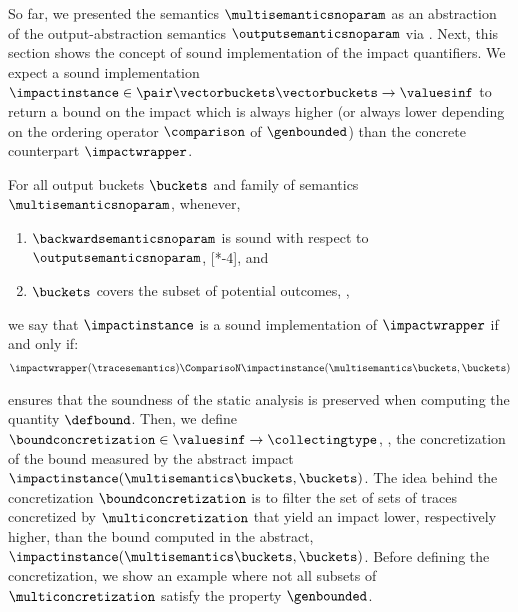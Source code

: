 So far, we presented the semantics $\multisemanticsnoparam$ as an abstraction of the output-abstraction semantics $\outputsemanticsnoparam$ via .
Next, this section shows the concept of sound implementation of the impact quantifiers.
We expect a sound implementation $\impactinstance\in\pair\vectorbuckets\vectorbuckets\to\valuesinf$ to return a bound on the impact which is always higher (or always lower depending on the ordering operator $\comparison$ of $\genbounded$) than the concrete counterpart $\impactwrapper$.

\begin{definition}
  For all output buckets $\buckets$ and family of semantics $\multisemanticsnoparam$,
  whenever,
  \begin{enumerate}[label=(\roman*)]
    \item $\backwardsemanticsnoparam$ is sound with respect to $\outputsemanticsnoparam$, \cf{} [*-4], and
    \item $\buckets$ covers the subset of potential outcomes, \cf{} ,
  \end{enumerate}
  we say that $\impactinstance$ is a \textup{sound implementation} of $\impactwrapper$ if and only if:
  \begin{eqnarray*}
  \impactwrapper(
    \tracesemantics
    ) \ComparisoN \impactinstance(\multisemantics\buckets, \buckets)
  \end{eqnarray*}
\end{definition}

 ensures that the soundness of the static analysis is preserved when computing the quantity $\defbound$.
Then, we define $\boundconcretization \in \valuesinf \to \collectingtype$, \ie, the concretization of the bound measured by the abstract impact $\impactinstance(\multisemantics\buckets, \buckets)$.
The idea behind the concretization $\boundconcretization$ is to filter the set of sets of traces concretized by $\multiconcretization$ that yield an impact lower, respectively higher, than the bound computed in the abstract, \cf{} $\impactinstance(\multisemantics\buckets, \buckets)$.
Before defining the concretization, we show an example where not all subsets of $\multiconcretization$ satisfy the property $\genbounded$.

